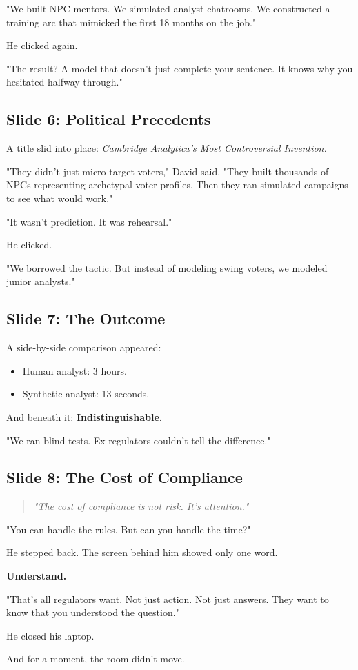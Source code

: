 "We built NPC mentors. We simulated analyst chatrooms. We constructed a training arc that mimicked the 
first 18 months on the job."

He clicked again.

"The result? A model that doesn’t just complete your sentence. It knows why you hesitated halfway through."

\subsection{Slide 6: Political Precedents}

A title slid into place:
\textit{Cambridge Analytica's Most Controversial Invention.}

"They didn’t just micro-target voters," David said. "They built thousands of NPCs representing archetypal 
voter profiles. Then they ran simulated campaigns to see what would work."

"It wasn’t prediction. It was rehearsal."

He clicked.

"We borrowed the tactic. But instead of modeling swing voters, we modeled junior analysts."

\subsection{Slide 7: The Outcome}

A side-by-side comparison appeared:
\begin{itemize}
\item Human analyst: 3 hours.
\item Synthetic analyst: 13 seconds.
\end{itemize}

And beneath it:
\textbf{Indistinguishable.}

"We ran blind tests. Ex-regulators couldn't tell the difference."

\subsection{Slide 8: The Cost of Compliance}

\begin{quote}
\textit{"The cost of compliance is not risk. It's attention."}
\end{quote}

"You can handle the rules. But can you handle the time?"

He stepped back.
The screen behind him showed only one word.

\begin{center}
\Huge
\textbf{Understand.}
\end{center}

"That's all regulators want. Not just action. Not just answers. They want to know that you understood 
the question."

He closed his laptop.

And for a moment, the room didn’t move.

